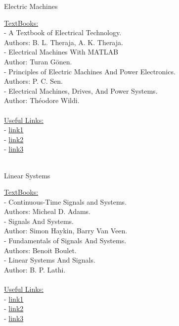 \documentclass{article}
\begin{document}
   
\newpage
\begin{center}
    \huge Electric Machines
\end{center}
\underline{\Large TextBooks:}\\ [0.15cm]
- A Textbook of Electrical Technology.\\
\indent Authors: B. L. Theraja, A. K. Theraja. \\
- Electrical Machines With MATLAB\\
\indent Author: Turan Gönen.\\ 
- Principles of Electric Machines And Power Electronics.\\
\indent Authors: P. C. Sen.\\
- Electrical Machines, Drives, And Power Systems.\\
\indent Author: Théodore Wildi.\\ \\

\noindent\underline{\Large Useful Links:}\\
- \href{URL}{link1}\\
- \href{URL}{link2}\\
- \href{URL}{link3}\\\\

\newpage
\begin{center}
    \huge Linear Systems
\end{center}
\underline{\Large TextBooks:}\\ [0.15cm]
- Continuous-Time Signals and Systems.\\
\indent Authors: Micheal D. Adams. \\
- Signals And Systems.\\
\indent Author: Simon Haykin, Barry Van Veen.\\ 
- Fundamentals of Signals And Systems.\\
\indent Authors: Benoit Boulet.\\
- Linear Systems And Signals.\\
\indent Author: B. P. Lathi.\\ \\

\noindent\underline{\Large Useful Links:}\\
- \href{URL}{link1}\\
- \href{URL}{link2}\\
- \href{URL}{link3}\\\\
   
\end{document}
